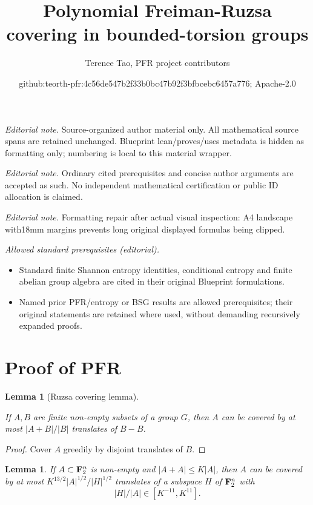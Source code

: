 \documentclass[10pt,a4paper]{article}
\title{Polynomial Freiman-Ruzsa covering in bounded-torsion groups}
\author{Terence Tao, PFR project contributors}
\date{github:teorth-pfr:4c56de547b2f33b0bc47b92f3bfbcebc6457a776; Apache-2.0}
\newtheorem{lemma}[theorem]{Lemma}
\newcommand{\lean}[1]{}
\newcommand{\leanok}{}
\newcommand{\chapter}[1]{\section{#1}}
\begin{document}
\maketitle
\noindent\textit{Editorial note.} Source-organized author material only. All mathematical source spans are retained unchanged. Blueprint lean/proves/uses metadata is hidden as formatting only; numbering is local to this material wrapper.\par\medskip
\noindent\textit{Editorial note.} Ordinary cited prerequisites and concise author arguments are accepted as such. No independent mathematical certification or public ID allocation is claimed.\par\medskip
\noindent\textit{Editorial note.} Formatting repair after actual visual inspection: A4 landscape with18mm margins prevents long original displayed formulas being clipped.\par\medskip
\noindent\textit{Allowed standard prerequisites (editorial).}\begin{itemize}
\item Standard finite Shannon entropy identities, conditional entropy and finite abelian group algebra are cited in their original Blueprint formulations.
\item Named prior PFR/entropy or BSG results are allowed prerequisites; their original statements are retained where used, without demanding recursively expanded proofs.
\end{itemize}\medskip
\chapter{Proof of PFR}

\begin{lemma}[Ruzsa covering lemma]
\label{ruz-cov}
\lean{Finset.ruzsa_covering_add}
\leanok
If $A,B$ are finite non-empty subsets of a group $G$, then $A$ can be covered by at most $|A+B|/|B|$ translates of $B-B$.
\end{lemma}
\begin{proof}
\leanok
Cover $A$ greedily by disjoint translates of $B$.
\end{proof}

\begin{lemma}\label{pfr_aux}
  \lean{PFR_conjecture_aux}\leanok If $A \subset {\bf F}_2^n$ is non-empty and
  $|A+A| \leq K|A|$, then $A$ can be covered by at most $K ^
  {13/2}|A|^{1/2}/|H|^{1/2}$ translates of a subspace $H$ of ${\bf F}_2^n$ with
  \begin{equation}
    \label{ah}
    |H|/|A| \in [K^{-11}, K^{11}].
  \end{equation}
  \end{lemma}
\end{document}
